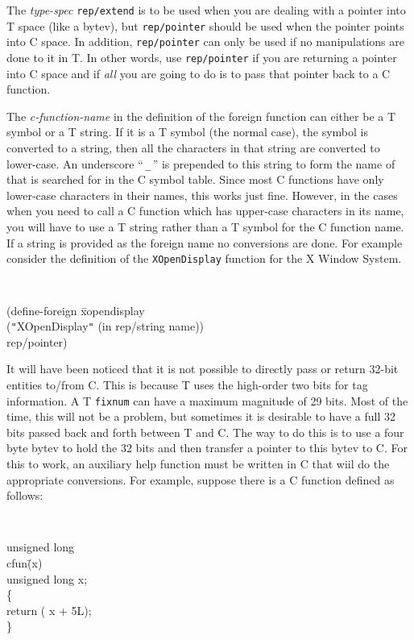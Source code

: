 The {\em type-spec\/} \verb!rep/extend! is to be used when you are
dealing with a pointer into T space (like a bytev), but
\verb!rep/pointer! should be used when the pointer points into C
space.
In addition, \verb!rep/pointer! can only be used if no manipulations
are done to it in T.
In other words, use \verb!rep/pointer! if you are returning a pointer
into C space and if {\em all\/} you are going to do is to pass that pointer
back to a C function.

The {\em c-function-name\/} in the definition of the foreign function
can either be a T symbol or a T string.
If it is a T symbol (the normal case), the symbol is converted to a
string, then all the characters in that string are converted to
lower-case.
An underscore ``\,\verb!_!\,'' is prepended to this string to form the
name of that is searched for in the C symbol table.
Since most C functions have only lower-case characters in their names,
this works just fine.
However, in the cases when you need to call a C function which has
upper-case characters in its name, you will have to use a T string
rather than a T symbol for the C function name.  If a string is provided as
the foreign name no conversions are done.
For example consider the definition of the {\tt XOpenDisplay}
function for the X Window System.

\horizline
{\tt
\begin{tabbing}
(define-foreign \= xopendisplay\+ \\
	(\verb!"!XOpenDisplay\verb!"! (in rep/string name))\\
	rep/pointer)
\end{tabbing}
}
\horizline

It will have been noticed that it is not possible to directly pass or
return 32-bit entities to/from C.
This is because T uses the high-order two bits for tag information.
A T {\tt fixnum} can have a maximum magnitude of 29 bits.
Most of the time, this will not be a problem, but sometimes it is
desirable to have a full 32 bits passed back and forth between T and
C.
The way to do this is to use a four byte bytev to hold the 32 bits and
then transfer a pointer to this bytev to C.
For this to work, an auxiliary help function must be written in C that
wiil do the appropriate conversions.
For example, suppose there is a C function defined as follows:

\horizline
{\tt
\begin{tabbing}
unsigned long\\
cfun\= (x)\\
	\> unsigned long x;\\
\{\\
	\> return ( x + 5L);\\
\}
\end{tabbing}
}
\horizline

